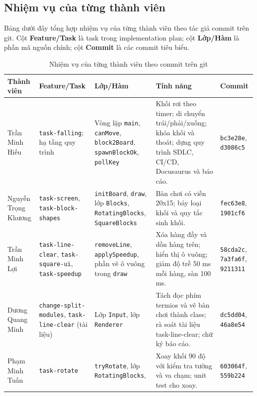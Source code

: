 \documentclass[12pt,a4paper]{article}
\begin{document}
\subsection{Nhiệm vụ của từng thành viên}

Bảng dưới đây tổng hợp nhiệm vụ của từng thành viên theo tác giả commit trên git.
Cột \textbf{Feature/Task} là task trong implementation plan; cột \textbf{Lớp/Hàm}
là phần mã nguồn chính; cột \textbf{Commit} là các commit tiêu biểu.

\begin{table}[H]
  \centering
  \footnotesize
  \caption{Nhiệm vụ của từng thành viên theo commit trên git}
  \begin{tabularx}{\textwidth}{P{2.3cm} P{2.3cm} P{3.0cm} Y P{1.7cm}}
    \toprule
    \textbf{Thành viên} & \textbf{Feature/Task} & \textbf{Lớp/Hàm} & \textbf{Tính năng} & \textbf{Commit} \\
    \midrule
    Trần Minh Hiếu & \texttt{task-falling}; hạ tầng quy trình & Vòng lặp \texttt{main}, \texttt{canMove}, \texttt{block2Board}, \texttt{spawnBlockOk}, \texttt{pollKey} & Khối rơi theo timer; di chuyển trái/phải/xuống; khóa khối và thoát; dựng quy trình SDLC, CI/CD, Docusaurus và báo cáo. & \texttt{bc3e28e}, \texttt{d3086c5} \\
    Nguyễn Trọng Khương & \texttt{task-screen}, \texttt{task-\-block-\-shapes} & \texttt{initBoard}, \texttt{draw}, lớp \texttt{Blocks}, \texttt{RotatingBlocks}, \texttt{SquareBlocks} & Bàn chơi có viền 20x15; bảy loại khối và quy tắc sinh khối. & \texttt{fec63e8}, \texttt{1901cf6} \\
    Trần Minh Lợi & \texttt{task-\-line-\-clear}, \texttt{task-\-square-\-ui}, \texttt{task-speedup} & \texttt{removeLine}, \texttt{applySpeedup}, phần vẽ ô vuông trong \texttt{draw} & Xóa hàng đầy và dồn hàng trên; hiển thị ô vuông; giảm độ trễ 50 ms mỗi hàng, sàn 100 ms. & \texttt{58cda2c}, \texttt{7a3fa6f}, \texttt{9211311} \\
    Dương Quang Minh & \texttt{change-\-split-\-modules}, \texttt{task-\-line-\-clear} (tài liệu) & Lớp \texttt{Input}, lớp \texttt{Renderer} & Tách đọc phím termios và vẽ bàn chơi thành class; rà soát tài liệu task-line-clear; chữ ký báo cáo. & \texttt{dc5dd04}, \texttt{46a8e54} \\
    Phạm Minh Tuấn & \texttt{task-rotate} & \texttt{tryRotate}, lớp \texttt{RotatingBlocks},  & Xoay khối 90 độ với kiểm tra tường và va chạm; unit test cho xoay. & \texttt{603064f}, \texttt{559b224} \\
    \bottomrule
  \end{tabularx}
\end{table}
\end{document}
